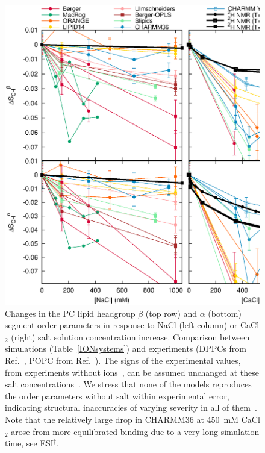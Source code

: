 \documentclass[twoside,twocolumn,9pt]{article}
\begin{document}
\begin{figure}[t]
  \centering
  \includegraphics[width=15cm]{../Fig/OrderParameterIONSchanges.eps}
  \caption{\label{ordPions}
    Changes in the PC lipid headgroup $\beta$ (top row) and $\alpha$ (bottom) segment order parameters in response to NaCl (left column) 
    or CaCl$_2$ (right) salt solution concentration increase. Comparison between simulations (Table~\ref{IONsystems}) and experiments
    (DPPCs from Ref.~, POPC from Ref.~). The signs of the experimental values, from
    experiments without ions~\cite{hong95a,hong95b,gross97}, can be assumed unchanged at these salt concentrations~\cite{altenbach84,ollila16}. 
    We stress that none of the models reproduces the order parameters without salt
    within experimental error, indicating structural inaccuracies of varying severity in all of them~\cite{botan15}.
    Note that the relatively large drop in CHARMM36 at 450~mM CaCl$_2$ arose from more equilibrated binding %
    due to a very long simulation time, see ESI$^\dag$.
  }
\end{figure}
\end{document}
